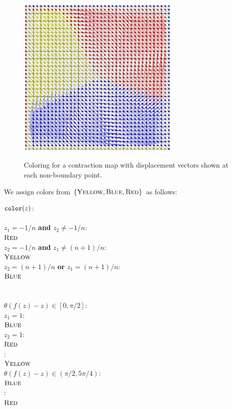   \begin{figure}[h] 
    \caption{Coloring for a contraction map with displacement vectors shown at each non-boundary point.}
    \centering
    \includegraphics[width=0.7\textwidth]{ContractionToEOPL_example1_displacement}
    \label{fig:displacement}
  \end{figure}

  We assign colors from $\left\{ \textsc{Yellow}, \textsc{Blue}, \textsc{Red} \right\}$ as follows:
  \begin{algo}
    $\operatorname{\texttt{color}}(z)$:\+
    \\ 
    \\ \IfB $z_1 = -1/n$ \textbf{and} $z_2 \neq -1/n$:\+
    \\   \ReturnB $\textsc{Red}$\-
    \\ \ElseIfB $z_2 = -1/n$ \textbf{and} $z_1 \neq (n+1)/n$:\+
    \\   \ReturnB $\textsc{Yellow}$\-
    \\ \ElseIfB $z_2 = (n+1)/n$ \textbf{or} $z_1 = (n+1)/n$:\+
    \\   \ReturnB $\textsc{Blue}$\-
    \\
    \\ 
    \\ \IfB $\theta(f(z) - z) \in [0, \pi/2]$:\+
    \\   \IfB $z_1 = 1$:\+
    \\     \ReturnB $\textsc{Blue}$\-
    \\   \ElseIfB $z_2 = 1$:\+
    \\     \ReturnB $\textsc{Red}$\-
    \\   \ElseB:\+
    \\     \ReturnB $\textsc{Yellow}$\-\-
    \\ \ElseIfB $\theta(f(z) - z) \in (\pi/2, 5\pi/4)$:\+
    \\   \ReturnB $\textsc{Blue}$\-
    \\ \ElseIfB:\+
    \\   \ReturnB $\textsc{Red}$\-\-
  \end{algo}

